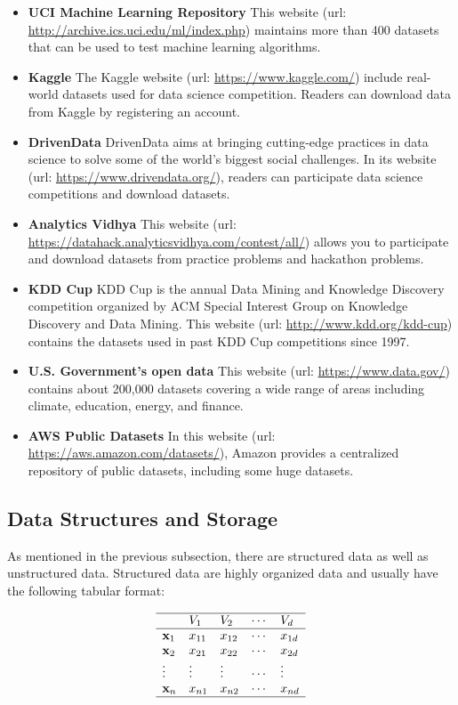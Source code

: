 \documentclass[]{book}
\theoremstyle{definition}
\theoremstyle{definition}
\theoremstyle{definition}
\theoremstyle{remark}
\begin{document}
\begin{itemize}
\item
  \textbf{UCI Machine Learning Repository} This website (url:
  \url{http://archive.ics.uci.edu/ml/index.php}) maintains more than 400
  datasets that can be used to test machine learning algorithms.
\item
  \textbf{Kaggle} The Kaggle website (url:
  \url{https://www.kaggle.com/}) include real-world datasets used for
  data science competition. Readers can download data from Kaggle by
  registering an account.
\item
  \textbf{DrivenData} DrivenData aims at bringing cutting-edge practices
  in data science to solve some of the world's biggest social
  challenges. In its website (url: \url{https://www.drivendata.org/}),
  readers can participate data science competitions and download
  datasets.
\item
  \textbf{Analytics Vidhya} This website (url:
  \url{https://datahack.analyticsvidhya.com/contest/all/}) allows you to
  participate and download datasets from practice problems and hackathon
  problems.
\item
  \textbf{KDD Cup} KDD Cup is the annual Data Mining and Knowledge
  Discovery competition organized by ACM Special Interest Group on
  Knowledge Discovery and Data Mining. This website (url:
  \url{http://www.kdd.org/kdd-cup}) contains the datasets used in past
  KDD Cup competitions since 1997.
\item
  \textbf{U.S. Government's open data} This website (url:
  \url{https://www.data.gov/}) contains about 200,000 datasets covering
  a wide range of areas including climate, education, energy, and
  finance.
\item
  \textbf{AWS Public Datasets} In this website (url:
  \url{https://aws.amazon.com/datasets/}), Amazon provides a centralized
  repository of public datasets, including some huge datasets.
\end{itemize}

\subsection{Data Structures and
Storage}\label{data-structures-and-storage}

As mentioned in the previous subsection, there are structured data as
well as unstructured data. Structured data are highly organized data and
usually have the following tabular format:

\[\begin{matrix}
\begin{array}{lllll} \hline
 & V_1 & V_2 & \cdots & V_d \  
\\\hline
\textbf{x}_1 & x_{11} & x_{12} & \cdots & x_{1d} \\
\textbf{x}_2 & x_{21} & x_{22} & \cdots & x_{2d} \\
\vdots & \vdots & \vdots & \cdots & \vdots \\
\textbf{x}_n & x_{n1} & x_{n2} & \cdots & x_{nd} \\
\hline
\end{array}
\end{matrix}
\]
\end{document}
